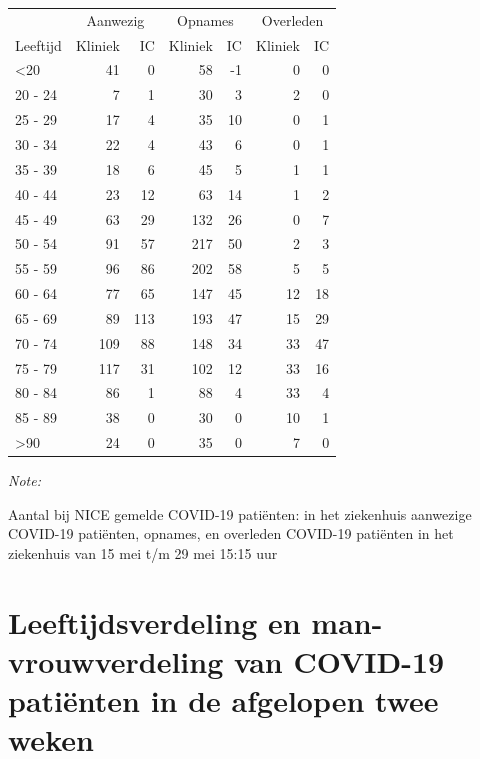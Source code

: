 \documentclass[
  english,
  man,floatsintext]{apa6}
\begin{document}
\begin{table}
\centering\begingroup\fontsize{10}{12}\selectfont

\begin{threeparttable}
\begin{tabular}{lrrrrrr}
\toprule
\multicolumn{1}{c}{ } & \multicolumn{2}{c}{Aanwezig} & \multicolumn{2}{c}{Opnames} & \multicolumn{2}{c}{Overleden} \\
\cmidrule(l{3pt}r{3pt}){2-3} \cmidrule(l{3pt}r{3pt}){4-5} \cmidrule(l{3pt}r{3pt}){6-7}
Leeftijd & Kliniek & IC & Kliniek & IC & Kliniek & IC\\
\midrule
<20 & 41 & 0 & 58 & -1 & 0 & 0\\
20 - 24 & 7 & 1 & 30 & 3 & 2 & 0\\
25 - 29 & 17 & 4 & 35 & 10 & 0 & 1\\
30 - 34 & 22 & 4 & 43 & 6 & 0 & 1\\
35 - 39 & 18 & 6 & 45 & 5 & 1 & 1\\
40 - 44 & 23 & 12 & 63 & 14 & 1 & 2\\
45 - 49 & 63 & 29 & 132 & 26 & 0 & 7\\
50 - 54 & 91 & 57 & 217 & 50 & 2 & 3\\
55 - 59 & 96 & 86 & 202 & 58 & 5 & 5\\
60 - 64 & 77 & 65 & 147 & 45 & 12 & 18\\
65 - 69 & 89 & 113 & 193 & 47 & 15 & 29\\
70 - 74 & 109 & 88 & 148 & 34 & 33 & 47\\
75 - 79 & 117 & 31 & 102 & 12 & 33 & 16\\
80 - 84 & 86 & 1 & 88 & 4 & 33 & 4\\
85 - 89 & 38 & 0 & 30 & 0 & 10 & 1\\
>90 & 24 & 0 & 35 & 0 & 7 & 0\\
\bottomrule
\end{tabular}
\begin{tablenotes}
\item \textit{Note: } 
\item Aantal bij NICE gemelde COVID-19 patiënten: in het ziekenhuis aanwezige COVID-19 patiënten, opnames, en overleden COVID-19 patiënten in het ziekenhuis van 15 mei t/m 29 mei 15:15 uur
\end{tablenotes}
\end{threeparttable}
\endgroup{}
\end{table}

\newpage

\hypertarget{leeftijdsverdeling-en-man-vrouwverdeling-van-covid-19-patiuxebnten-in-de-afgelopen-twee-weken}{%
\section{Leeftijdsverdeling en man-vrouwverdeling van COVID-19 patiënten in de afgelopen twee weken}\label{leeftijdsverdeling-en-man-vrouwverdeling-van-covid-19-patiuxebnten-in-de-afgelopen-twee-weken}}
\end{document}
